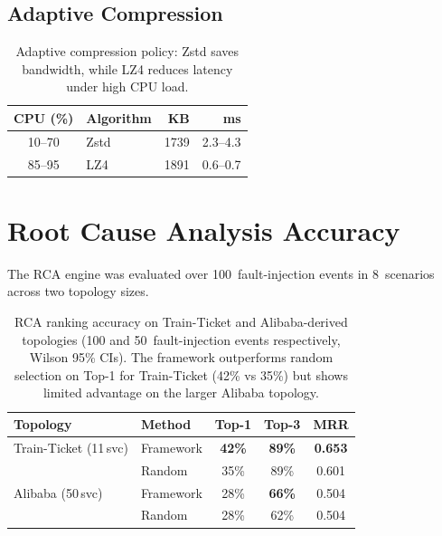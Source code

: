 \subsection{Adaptive Compression}
\label{subsec:eval_compression}

\begin{table}[H]
    \centering
    \small
    \begin{tabular}{|c|l|r|r|}
        \hline
        \textbf{CPU (\%)} & \textbf{Algorithm} & \textbf{KB} & \textbf{ms} \\
        \hline
        10--70 & Zstd & 1739 & 2.3--4.3 \\
        85--95 & LZ4 & 1891 & 0.6--0.7 \\
        \hline
    \end{tabular}
    \caption{Adaptive compression policy: Zstd saves bandwidth, while LZ4
             reduces latency under high CPU load.}
    \label{tab:adaptive_compression}
\end{table}

\section{Root Cause Analysis Accuracy}
\label{sec:eval_rca}

The RCA engine was evaluated over 100~fault-injection events in 8~scenarios
across two topology sizes.

\begin{table}[H]
    \centering
    \small
    \begin{tabular}{|l|l|c|c|c|}
        \hline
        \textbf{Topology} & \textbf{Method} & \textbf{Top-1} & \textbf{Top-3}
        & \textbf{MRR} \\
        \hline
        Train-Ticket (11\,svc) & Framework & \textbf{42\%} & \textbf{89\%}
        & \textbf{0.653} \\
        & Random & 35\% & 89\% & 0.601 \\
        \hline
        Alibaba (50\,svc) & Framework & 28\% & \textbf{66\%} & 0.504 \\
        & Random & 28\% & 62\% & 0.504 \\
        \hline
    \end{tabular}
    \caption{RCA ranking accuracy on Train-Ticket and Alibaba-derived
             topologies (100 and 50~fault-injection events respectively,
             Wilson 95\% CIs). The framework outperforms random selection
             on Top-1 for Train-Ticket (42\% vs 35\%) but shows limited
             advantage on the larger Alibaba topology.}
    \label{tab:rca_results}
\end{table}

